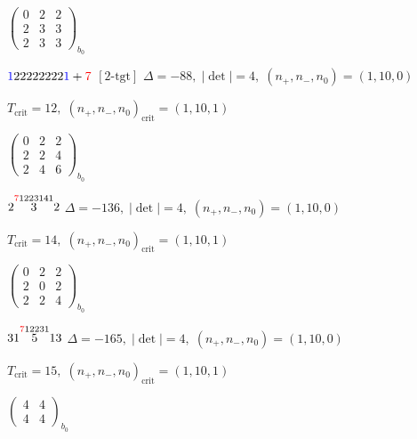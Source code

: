 \documentclass[10pt]{article}
\begin{document}
\hspace{2em}$\left(\begin{smallmatrix}0 & 2 & 2 \\ 2 & 3 & 3 \\ 2 & 3 & 3\end{smallmatrix}\right)_{\!b_0}$

\smallskip

$\textcolor{blue}{1}22222222\textcolor{blue}{1}+\textcolor{red}{7}$ $\scriptstyle [2\text{-tgt}]$ \quad $\Delta=-88,\; |\det|=4,\; (n_+,n_-,n_0)=(1,10,0)$

\hspace{1em}$T_{\text{crit}}=12,\; (n_+,n_-,n_0)_{\text{crit}}=(1,10,1)$

\hspace{2em}$\left(\begin{smallmatrix}0 & 2 & 2 \\ 2 & 2 & 4 \\ 2 & 4 & 6\end{smallmatrix}\right)_{\!b_0}$

\smallskip

$2\overset{\textcolor{red}{7}1223141}{3}2$ \quad $\Delta=-136,\; |\det|=4,\; (n_+,n_-,n_0)=(1,10,0)$

\hspace{1em}$T_{\text{crit}}=14,\; (n_+,n_-,n_0)_{\text{crit}}=(1,10,1)$

\hspace{2em}$\left(\begin{smallmatrix}0 & 2 & 2 \\ 2 & 0 & 2 \\ 2 & 2 & 4\end{smallmatrix}\right)_{\!b_0}$

\smallskip

$31\overset{\textcolor{red}{7}12231}{5}13$ \quad $\Delta=-165,\; |\det|=4,\; (n_+,n_-,n_0)=(1,10,0)$

\hspace{1em}$T_{\text{crit}}=15,\; (n_+,n_-,n_0)_{\text{crit}}=(1,10,1)$

\hspace{2em}$\left(\begin{smallmatrix}4 & 4 \\ 4 & 4\end{smallmatrix}\right)_{\!b_0}$

\smallskip
\end{document}
